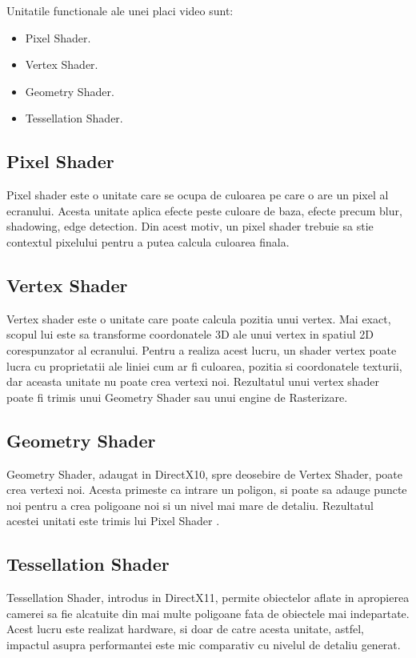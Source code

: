 Unitatile functionale ale unei placi video sunt:

\begin{itemize}

\item Pixel Shader.
\item Vertex Shader.
\item Geometry Shader.
\item Tessellation Shader.

\end{itemize}

\subsection{Pixel Shader}

Pixel shader este o unitate care se ocupa de culoarea pe care o are un pixel al ecranului. Acesta
unitate aplica efecte peste culoare de baza, efecte precum blur, shadowing, edge detection. Din
acest motiv, un pixel shader trebuie sa stie contextul pixelului pentru a putea calcula culoarea
finala.

\subsection{Vertex Shader}

Vertex shader este o unitate care poate calcula pozitia unui vertex. Mai exact, scopul lui este sa
transforme coordonatele 3D ale unui vertex in spatiul 2D corespunzator al ecranului. Pentru a
realiza acest lucru, un shader vertex poate lucra cu proprietatii ale liniei cum ar fi culoarea,
pozitia si coordonatele texturii, dar aceasta unitate nu poate crea vertexi noi. Rezultatul unui
vertex shader poate fi trimis unui Geometry Shader sau unui engine de Rasterizare.

\subsection{Geometry Shader}

Geometry Shader, adaugat in DirectX10, spre deosebire de Vertex Shader, poate crea vertexi noi.
Acesta primeste ca intrare un poligon, si poate sa adauge puncte noi pentru a crea poligoane noi si
un nivel mai mare de detaliu. Rezultatul acestei unitati este trimis lui Pixel Shader
\cite{kirk2007nvidia}.

\subsection{Tessellation Shader}

Tessellation Shader, introdus in DirectX11, permite obiectelor aflate in apropierea camerei sa fie
alcatuite din mai multe poligoane fata de obiectele mai indepartate. Acest lucru este realizat
hardware, si doar de catre acesta unitate, astfel, impactul asupra performantei este mic comparativ
cu nivelul de detaliu generat.
